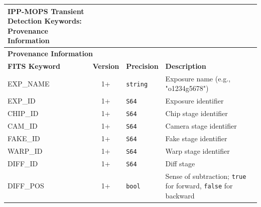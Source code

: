 \documentclass[panstarrs,spec]{panstarrs}
\begin{document}
\begin{center}
  \begin{longtable}{|lcp{0.5in}p{3in}|}
    \caption{IPP-MOPS Transient Detection Keywords:\\ Provenance Information}\label{table-keywords-provenance}\\
    \hline\hline
    \multicolumn{4}{|l|}{\null\hspace{10mm}\textbf{Provenance Information}}\\
    \hline \hline
    {\bf FITS Keyword}
    & \parbox{0.5in}{\textbf{Version}}
    & {\bf Precision}
    & {\bf Description} \\
    \hline
    EXP\_NAME & 1+ & \texttt{string} & Exposure name (e.g., "o1234g5678")\\
    \hline
    EXP\_ID & 1+ & \texttt{S64} & Exposure identifier \\
    \hline
    CHIP\_ID & 1+ & \texttt{S64} & Chip stage identifier \\
    \hline
    CAM\_ID & 1+ & \texttt{S64} & Camera stage identifier \\
    \hline
    FAKE\_ID & 1+ & \texttt{S64} & Fake stage identifier \\
    \hline
    WARP\_ID  & 1+ & \texttt{S64} & Warp stage identifier \\
    \hline
    DIFF\_ID & 1+ & \texttt{S64} & Diff stage \\
    \hline
    DIFF\_POS & 1+ & \texttt{bool} & Sense of subtraction; \texttt{true} for forward, 
    \texttt{false} for backward\\
    \hline
  \end{longtable}
\end{center}
  
\end{document}

